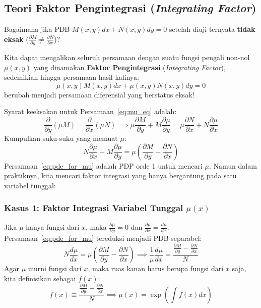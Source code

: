 \documentclass[11pt,a4paper]{article}
\theoremstyle{definition}
\begin{document}
\subsection{Teori Faktor Pengintegrasi (\textit{Integrating Factor})}

Bagaimana jika PDB $M(x,y)dx + N(x,y)dy = 0$ setelah diuji ternyata \textbf{tidak eksak} ($\frac{\partial M}{\partial y} \neq \frac{\partial N}{\partial x}$)?

Kita dapat mengalikan seluruh persamaan dengan suatu fungsi pengali non-nol $\mu(x,y)$ yang dinamakan \textbf{Faktor Pengintegrasi} (\textit{Integrating Factor}), sedemikian hingga persamaan hasil kalinya:
\begin{equation}
    \mu(x,y) M(x,y) dx + \mu(x,y) N(x,y) dy = 0
    \label{eq:mu_eq}
\end{equation}
berubah menjadi persamaan diferensial yang berstatus eksak!

Syarat keeksakan untuk Persamaan~\eqref{eq:mu_eq} adalah:
\begin{equation}
    \frac{\partial}{\partial y} \left( \mu M \right) = \frac{\partial}{\partial x} \left( \mu N \right)
    \implies \mu \frac{\partial M}{\partial y} + M \frac{\partial \mu}{\partial y} = \mu \frac{\partial N}{\partial x} + N \frac{\partial \mu}{\partial x}
\end{equation}
Kumpulkan suku-suku yang memuat $\mu$:
\begin{equation}
    N \frac{\partial \mu}{\partial x} - M \frac{\partial \mu}{\partial y} = \mu \left( \frac{\partial M}{\partial y} - \frac{\partial N}{\partial x} \right)
    \label{eq:pde_for_mu}
\end{equation}
Persamaan~\eqref{eq:pde_for_mu} adalah PDP orde 1 untuk mencari $\mu$. Namun dalam praktiknya, kita mencari faktor integrasi yang hanya bergantung pada satu variabel tunggal:

\subsubsection{Kasus 1: Faktor Integrasi Variabel Tunggal \texorpdfstring{$\mu(x)$}{mu(x)}}
Jika $\mu$ hanya fungsi dari $x$, maka $\frac{\partial \mu}{\partial y} = 0$ dan $\frac{\partial \mu}{\partial x} = \frac{d\mu}{dx}$. Persamaan~\eqref{eq:pde_for_mu} tereduksi menjadi PDB separabel:
\begin{equation}
    N \frac{d\mu}{dx} = \mu \left( \frac{\partial M}{\partial y} - \frac{\partial N}{\partial x} \right) \implies \frac{1}{\mu} \frac{d\mu}{dx} = \frac{\frac{\partial M}{\partial y} - \frac{\partial N}{\partial x}}{N}
\end{equation}
Agar $\mu$ murni fungsi dari $x$, maka ruas kanan harus berupa fungsi dari $x$ saja, kita definisikan sebagai $f(x)$:
\begin{equation}
    f(x) \equiv \frac{\frac{\partial M}{\partial y} - \frac{\partial N}{\partial x}}{N} \implies \mu(x) = \exp\left( \int f(x) dx \right)
    \label{eq:mu_x}
\end{equation}
\end{document}
